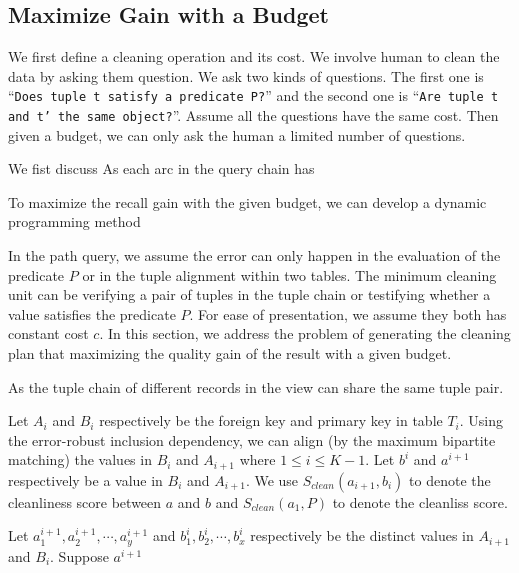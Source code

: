 \subsection{Maximize Gain with a Budget}\label{subsec:gain}

We first define a cleaning operation and its cost. We involve human to clean the data by asking them question. We ask two kinds of questions. The first one is ``\texttt{Does tuple t satisfy a predicate P?}'' and the second one is ``\texttt{Are tuple t and t' the same object?}''. Assume all the questions have the same cost. Then given a budget, we can only ask the human a limited number of questions.











\iffalse
We fist discuss As each arc in the query chain has 

To maximize the recall gain with the given budget, we can develop a dynamic programming method


In the path query, we assume the error can only happen in the evaluation of the predicate $P$ or in the tuple alignment within two tables. The minimum cleaning unit can be verifying a pair of tuples in the tuple chain or testifying whether a value satisfies the predicate $P$. For ease of presentation, we assume they both has constant cost $c$. In this section, we address the problem of generating the cleaning plan that maximizing the quality gain of the result with a given budget.


As the tuple chain of different records in the view can share the same tuple pair. 




Let $A_i$ and $B_i$ respectively be the foreign key and primary key in table $T_i$. Using the error-robust inclusion dependency, we can align (by the maximum bipartite matching) the values in $B_i$ and $A_{i+1}$ where $1\leq i\leq K-1$. Let $b^i$ and $a^{i+1}$ respectively be a value in $B_i$ and $A_{i+1}$. We use $S_{clean}(a_{i+1},b_i)$ to denote the cleanliness score between $a$ and $b$ and $S_{clean}(a_1,P)$ to denote the cleanliss score.


Let $a^{i+1}_1, a^{i+1}_2, \cdots, a^{i+1}_y$ and $b^{i}_1, b^{i}_2, \cdots, b^{i}_x$ respectively be the distinct values in  $A_{i+1}$ and $B_i$. Suppose $a^{i+1}$


